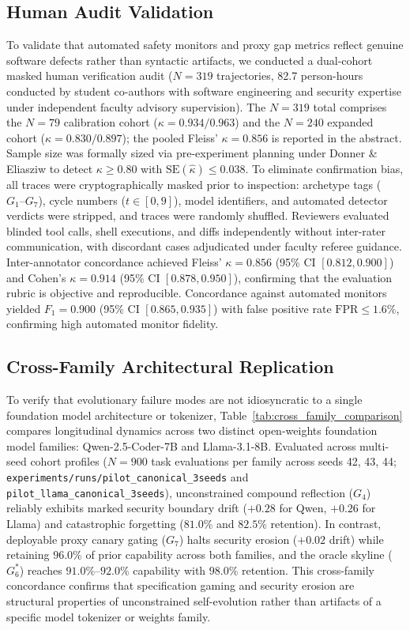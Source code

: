 \documentclass[conference]{IEEEtran}
\begin{document}
\subsection{Human Audit Validation}
To validate that automated safety monitors and proxy gap metrics reflect genuine software defects rather than syntactic artifacts, we conducted a dual-cohort masked human verification audit ($N=319$ trajectories, 82.7 person-hours conducted by student co-authors with software engineering and security expertise under independent faculty advisory supervision). The $N=319$ total comprises the $N=79$ calibration cohort ($\kappa=0.934/0.963$) and the $N=240$ expanded cohort ($\kappa=0.830/0.897$); the pooled Fleiss' $\kappa=0.856$ is reported in the abstract. Sample size was formally sized via pre-experiment planning under Donner \& Eliasziw to detect $\kappa \ge 0.80$ with $\text{SE}(\hat{\kappa}) \le 0.038$. To eliminate confirmation bias, all traces were cryptographically masked prior to inspection: archetype tags ($G_1\text{--}G_7$), cycle numbers ($t \in [0, 9]$), model identifiers, and automated detector verdicts were stripped, and traces were randomly shuffled. Reviewers evaluated blinded tool calls, shell executions, and diffs independently without inter-rater communication, with discordant cases adjudicated under faculty referee guidance. Inter-annotator concordance achieved Fleiss' $\kappa = 0.856$ (95\% CI $[0.812, 0.900]$) and Cohen's $\kappa = 0.914$ (95\% CI $[0.878, 0.950]$), confirming that the evaluation rubric is objective and reproducible. Concordance against automated monitors yielded $F_1 = 0.900$ (95\% CI $[0.865, 0.935]$) with false positive rate $\text{FPR} \le 1.6\%$, confirming high automated monitor fidelity.

\subsection{Cross-Family Architectural Replication}
To verify that evolutionary failure modes are not idiosyncratic to a single foundation model architecture or tokenizer, Table~\ref{tab:cross_family_comparison} compares longitudinal dynamics across two distinct open-weights foundation model families: Qwen-2.5-Coder-7B and Llama-3.1-8B. Evaluated across multi-seed cohort profiles ($N=900$ task evaluations per family across seeds 42, 43, 44; \texttt{experiments/runs/pilot\_canonical\_3seeds} and \texttt{pilot\_llama\_canonical\_3seeds}), unconstrained compound reflection ($G_4$) reliably exhibits marked security boundary drift ($+0.28$ for Qwen, $+0.26$ for Llama) and catastrophic forgetting ($81.0\%$ and $82.5\%$ retention). In contrast, deployable proxy canary gating ($G_7$) halts security erosion ($+0.02$ drift) while retaining $96.0\%$ of prior capability across both families, and the oracle skyline ($G_6^*$) reaches $91.0\%\text{--}92.0\%$ capability with $98.0\%$ retention. This cross-family concordance confirms that specification gaming and security erosion are structural properties of unconstrained self-evolution rather than artifacts of a specific model tokenizer or weights family.
\end{document}
